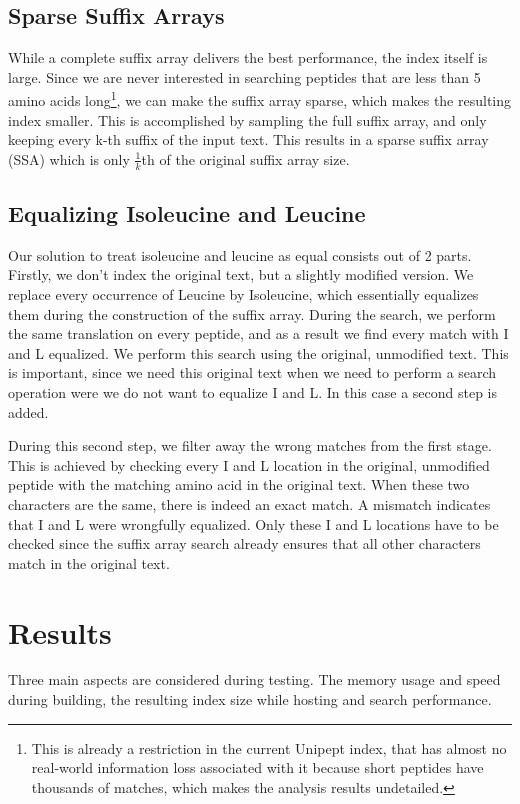\documentclass[10pt]{article}
\begin{document}
\begin{multicols}{2}
        \subsection{Sparse Suffix Arrays}
        While a complete suffix array delivers the best performance, the index itself is large.
        Since we are never interested in searching peptides that are less than 5 amino acids long\footnote{This is already a restriction in the current Unipept index, that has almost no real-world information loss associated with it because short peptides have thousands of matches, which makes the analysis results undetailed.}, we can make the suffix array sparse, which makes the resulting index smaller.
        This is accomplished by sampling the full suffix array, and only keeping every k-th suffix of the input text.
        This results in a sparse suffix array (SSA) which is only $\frac{1}{k}$th of the original suffix array size.

        \subsection{Equalizing Isoleucine and Leucine}
        Our solution to treat isoleucine and leucine as equal consists out of 2 parts.
        Firstly, we don't index the original text, but a slightly modified version.
        We replace every occurrence of Leucine by Isoleucine, which essentially equalizes them during the construction of the suffix array.
        During the search, we perform the same translation on every peptide, and as a result we find every match with I and L equalized.
        We perform this search using the original, unmodified text.
        This is important, since we need this original text when we need to perform a search operation were we do not want to equalize I and L\@.
        In this case a second step is added.

        During this second step, we filter away the wrong matches from the first stage.
        This is achieved by checking every I and L location in the original, unmodified peptide with the matching amino acid in the original text.
        When these two characters are the same, there is indeed an exact match.
        A mismatch indicates that I and L were wrongfully equalized.
        Only these I and L locations have to be checked since the suffix array search already ensures that all other characters match in the original text.


        \section{Results}\label{sec:results} %
        Three main aspects are considered during testing.
        The memory usage and speed during building, the resulting index size while hosting and search performance.


\end{multicols}
\end{document}
